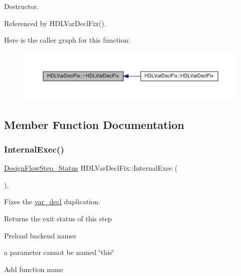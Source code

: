 Destructor. 



Referenced by H\+D\+L\+Var\+Decl\+Fix().

Here is the caller graph for this function\+:
\nopagebreak
\begin{figure}[H]
\begin{center}
\leavevmode
\includegraphics[width=350pt]{d8/d32/classHDLVarDeclFix_a9102f36dc49a6a7421cf6e604849565b_icgraph}
\end{center}
\end{figure}


\subsection{Member Function Documentation}
\mbox{\label{classHDLVarDeclFix_a89837edfac2c7f189baf7b0aada043da}} 
\subsubsection{\texorpdfstring{Internal\+Exec()}{InternalExec()}}
{\footnotesize\ttfamily \hyperlink{design__flow__step_8hpp_afb1f0d73069c26076b8d31dbc8ebecdf}{Design\+Flow\+Step\+\_\+\+Status} H\+D\+L\+Var\+Decl\+Fix\+::\+Internal\+Exec (\begin{DoxyParamCaption}{ }\end{DoxyParamCaption})\hspace{0.3cm}{\ttfamily [override]}, {\ttfamily [virtual]}}



Fixes the \hyperlink{structvar__decl}{var\+\_\+decl} duplication. 

\begin{DoxyReturn}{Returns}
the exit status of this step 
\end{DoxyReturn}
Preload backend names

a parameter cannot be named \char`\"{}this\char`\"{}

Add function name

